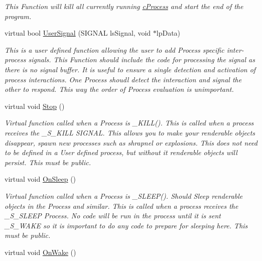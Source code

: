 \begin{DoxyCompactItemize}
\begin{DoxyCompactList}\small\item\em This Function will kill all currently running \hyperlink{classc_process}{cProcess} and start the end of the program. \end{DoxyCompactList}\item 
virtual bool \hyperlink{classc_process_a43924ae589dc673aac843af9da1410c7}{UserSignal} (SIGNAL lsSignal, void $\ast$lpData)
\begin{DoxyCompactList}\small\item\em This is a user defined function allowing the user to add Process specific inter-\/process signals. This Function should include the code for processing the signal as there is no signal buffer. It is useful to ensure a single detection and activation of process interactions. One Process shoudl detect the interaction and signal the other to respond. This way the order of Process evaluation is unimportant. \end{DoxyCompactList}\item 
\hypertarget{classc_process_ab967568c0892c868c5904d27a91072c7}{
virtual void \hyperlink{classc_process_ab967568c0892c868c5904d27a91072c7}{Stop} ()}
\label{classc_process_ab967568c0892c868c5904d27a91072c7}

\begin{DoxyCompactList}\small\item\em Virtual function called when a Process is \_\-KILL(). This is called when a process receives the \_\-S\_\-KILL SIGNAL. This allows you to make your renderable objects disappear, spawn new processes such as shrapnel or explosions. This does not need to be defined in a User defined process, but without it renderable objects will persist. This must be public. \end{DoxyCompactList}\item 
\hypertarget{classc_process_ad9e66e8d1965e8974ef98121dc123bc5}{
virtual void \hyperlink{classc_process_ad9e66e8d1965e8974ef98121dc123bc5}{OnSleep} ()}
\label{classc_process_ad9e66e8d1965e8974ef98121dc123bc5}

\begin{DoxyCompactList}\small\item\em Virtual function called when a Process is \_\-SLEEP(). Should Sleep renderable objects in the Process and similar. This is called when a process receives the \_\-S\_\-SLEEP Process. No code will be run in the process until it is sent \_\-S\_\-WAKE so it is important to do any code to prepare for sleeping here. This must be public. \end{DoxyCompactList}\item 
\hypertarget{classc_process_a5d5c0f3e58dbe50b7859394f16102257}{
virtual void \hyperlink{classc_process_a5d5c0f3e58dbe50b7859394f16102257}{OnWake} ()}
\label{classc_process_a5d5c0f3e58dbe50b7859394f16102257}


\end{DoxyCompactItemize}
